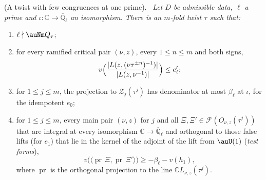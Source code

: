\documentclass[10pt]{amsart}
\theoremstyle{definition}
\theoremstyle{remark}
\newcommand{\C}{\mathbb C}
\newcommand{\Q}{\mathbb Q}
\providecommand{\auQlb}{\overline{\Q}_\ell}
\providecommand{\pgpr}{\operatorname{pr}}
\providecommand{\pgv}{v}
\newenvironment{quotedthm}[2]{\par\medskip\noindent\begingroup
  \textbf{#1}#2.\ \itshape\ignorespaces}{\endgroup\par\medskip}
\begin{document}
\begin{quotedthm}{\cite[Theorem~2.2]{P55}}{ (A twist with few congruences at one prime)}
Let $D$ be admissible data, $\ell$ a prime and $\iota\colon\C\to\auQlb$ an isomorphism. There is an
$m$-fold twist $\tau$ such that:
\begin{enumerate}
\item[(a)] $\ell\nmid\auNm Q_\tau$;
\item[(b)] for every ramified critical pair $(\nu,z)$, every $1\le n\le m$ and both signs,
\[
\pgv\Bigl(\frac{|L(z,(\nu\tau^{\pm n})^{-1})|}{|L(z,\nu^{-1})|}\Bigr)\le e'_\ell;
\]
\item[(c)] for $1\le j\le m$, the projection to $\mathcal Z_j(\tau^j)$ has denominator at most
$\beta_\ell$ at $\iota$, for the idempotent $e_0$;
\item[(d)] for $1\le j\le m$, every main pair $(\nu,z)$ for $j$ and all $\Xi,\Xi'\in\mathcal
F(O_{\nu,z}(\tau^j))$ that are integral at every isomorphism $\C\to\auQlb$ and orthogonal to those
false lifts (for $e_1$) that lie in the kernel of the adjoint of the lift from $\auU(1)$
(\emph{test forms}),
\[
\pgv\bigl(\langle\pgpr\,\Xi,\pgpr\,\Xi'\rangle\bigr)\ge-\beta_\ell-\pgv(h_1),
\]
where $\pgpr$ is the orthogonal projection to the line $\C L_{\nu,z}(\tau^j)$.
\end{enumerate}
\end{quotedthm}
\end{document}
